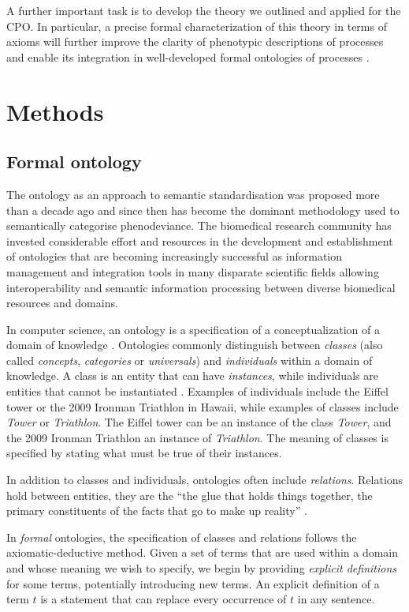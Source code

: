 \documentclass[11pt]{article}
\renewcommand{\cite}{\citep}
\begin{document}
A further important task is to develop the theory we outlined and
applied for the CPO. In particular, a precise formal characterization
of this theory in terms of axioms will further improve the clarity of
phenotypic descriptions of processes and enable its integration in
well-developed formal ontologies of processes \cite{Herre2006,
  Gruninger2010}.

\section{Methods}
\subsection{Formal ontology}
The ontology as an approach to semantic standardisation was proposed
more than a decade ago and since then has become the dominant
methodology used to semantically categorise phenodeviance.  The
biomedical research community has invested considerable effort and
resources in the development and establishment of ontologies that are
becoming increasingly successful as information management and
integration tools in many disparate scientific fields allowing
interoperability and semantic information processing between diverse
biomedical resources and domains.

In computer science, an ontology is a specification of a
conceptualization of a domain of knowledge \cite{Gruber1995,
  Guarino1998}.  Ontologies commonly distinguish between {\em classes}
(also called {\em concepts}, {\em categories} or {\em universals}) and
{\em individuals} within a domain of knowledge. A class is an entity
that can have {\em instances}, while individuals are entities that
cannot be instantiated \cite{Herre2006}. Examples of individuals
include the Eiffel tower or the 2009 Ironman Triathlon in Hawaii,
while examples of classes include {\em Tower} or {\em Triathlon}. The
Eiffel tower can be an instance of the class {\em Tower}, and the 2009
Ironman Triathlon an instance of {\em Triathlon}.  The meaning of
classes is specified by stating what must be true of their instances.

In addition to classes and individuals, ontologies often include {\em
  relations}. Relations hold between entities, they are the ``the glue
that holds things together, the primary constituents of the facts that
go to make up reality'' \cite{Barwise1989}.

In {\em formal} ontologies, the specification of classes and relations
follows the axiomatic-deductive method. Given a set of terms that are
used within a domain and whose meaning we wish to specify, we begin by
providing {\em explicit definitions} for some terms, potentially
introducing new terms. An explicit definition of a term $t$ is a
statement that can replace every occurrence of $t$ in any sentence.
\end{document}
